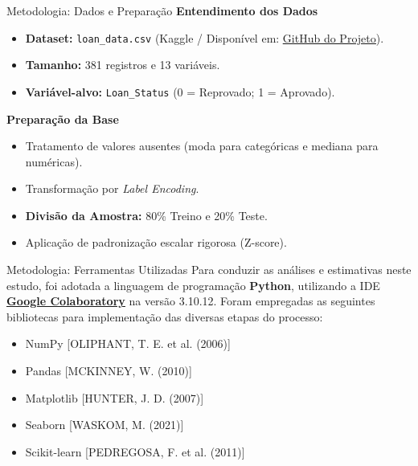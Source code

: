 \documentclass[aspectratio=169]{beamer}
\begin{document}
\begin{frame}{Metodologia: Dados e Preparação}
    \textbf{Entendimento dos Dados}
    \begin{itemize}
        \item \textbf{Dataset:} \texttt{loan\_data.csv} (Kaggle / Disponível em: \href{https://github.com/MarioDhiego/Slide_ERIN_2026/blob/main/loan_data.csv}{\color{blue}\underline{GitHub do Projeto}}).
        \item \textbf{Tamanho:} 381 registros e 13 variáveis.
        \item \textbf{Variável-alvo:} \texttt{Loan\_Status} (0 = Reprovado; 1 = Aprovado).
    \end{itemize}
    \vspace{0.3cm}
    
    \textbf{Preparação da Base}
    \begin{itemize}
        \item Tratamento de valores ausentes (moda para categóricas e mediana para numéricas).
        \item Transformação por \textit{Label Encoding}.
        \item \textbf{Divisão da Amostra:} 80\% Treino e 20\% Teste.
        \item Aplicação de padronização escalar rigorosa (Z-score).
    \end{itemize}
\end{frame}

\begin{frame}{Metodologia: Ferramentas Utilizadas}
Para conduzir as análises e estimativas neste estudo, foi adotada a linguagem de programação \textbf{Python}, utilizando a IDE \href{https://colab.research.google.com/drive/1bM0SFVu0IQhGwztcZHo2HhptDlSos2jZ#scrollTo=lNeeCTE95Ab9}{\color{blue}\textbf{\underline{Google Colaboratory}}} na versão 3.10.12. Foram empregadas as seguintes bibliotecas para implementação das diversas etapas do processo:  
    \vspace{0.3cm}
    \begin{itemize}
        \item NumPy [OLIPHANT, T. E. et al. (2006)]
        \item Pandas [MCKINNEY, W. (2010)]
        \item Matplotlib [HUNTER, J. D. (2007)]
        \item Seaborn [WASKOM, M. (2021)]
        \item Scikit-learn [PEDREGOSA, F. et al. (2011)]
    \end{itemize}
\end{frame}
\end{document}
